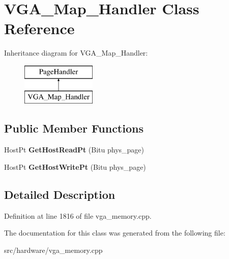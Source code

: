 \hypertarget{classVGA__Map__Handler}{\section{V\-G\-A\-\_\-\-Map\-\_\-\-Handler Class Reference}
\label{classVGA__Map__Handler}
}
Inheritance diagram for V\-G\-A\-\_\-\-Map\-\_\-\-Handler\-:\begin{figure}[H]
\begin{center}
\leavevmode
\includegraphics[height=2.000000cm]{classVGA__Map__Handler}
\end{center}
\end{figure}
\subsection*{Public Member Functions}
\begin{DoxyCompactItemize}
\item 
\hypertarget{classVGA__Map__Handler_a23bc58413fad28c04578297037382551}{Host\-Pt {\bfseries Get\-Host\-Read\-Pt} (Bitu phys\-\_\-page)}\label{classVGA__Map__Handler_a23bc58413fad28c04578297037382551}

\item 
\hypertarget{classVGA__Map__Handler_aaad4aea2654a2d31733a7213894d90a4}{Host\-Pt {\bfseries Get\-Host\-Write\-Pt} (Bitu phys\-\_\-page)}\label{classVGA__Map__Handler_aaad4aea2654a2d31733a7213894d90a4}

\end{DoxyCompactItemize}


\subsection{Detailed Description}


Definition at line 1816 of file vga\-\_\-memory.\-cpp.



The documentation for this class was generated from the following file\-:\begin{DoxyCompactItemize}
\item 
src/hardware/vga\-\_\-memory.\-cpp\end{DoxyCompactItemize}
